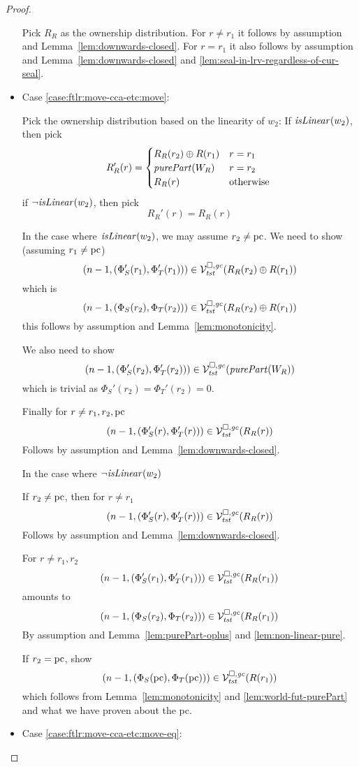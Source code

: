 \begin{proof}
\begin{itemize}
    Pick $R_R$ as the ownership distribution.
    For $r \neq r_1$ it follows by assumption and Lemma~\ref{lem:downwards-closed}.
    For $r = r_1$ it also follows by assumption and Lemma~\ref{lem:downwards-closed} and \ref{lem:seal-in-lrv-regardless-of-cur-seal}.

  \item Case \ref{case:ftlr:move-cca-etc:move}:

    Pick the ownership distribution based on the linearity of $w_2$: If $\isLinear{w_2}$, then pick
    \[
      R_R'(r) =
      \begin{cases}
        R_R(r_2) \oplus R(r_1) & r = r_1 \\
        \purePart{W_R}         & r = r_2 \\
        R_R(r)                 & \totherwise
      \end{cases}
    \]
    if $\neg \isLinear{w_2}$, then pick
    \[
      R_R'(r) = R_R(r)
    \]

    In the case where $\isLinear{w_2}$, we may assume $r_2 \neq \pcreg$. We need to show (assuming $r_1 \neq \pcreg$)
    \[
      \npair[n-1]{(\Phi_S'(r_1),\Phi_T'(r_1))} \in \lrvg{\trust}(R_R(r_2) \oplus R(r_1))
    \]
    which is 
    \[
      \npair[n-1]{(\Phi_S(r_2),\Phi_T(r_2))} \in \lrvg{\trust}(R_R(r_2) \oplus R(r_1))
    \]
    this follows by assumption and Lemma~\ref{lem:monotonicity}.

    We also need to show
    \[
      \npair[n-1]{(\Phi_S'(r_2),\Phi_T'(r_2))} \in \lrvg{\trust}(\purePart{W_R})
    \]
    which is trivial as $\Phi_S'(r_2) = \Phi_T'(r_2) = 0$. 

    Finally for $r \neq r_1,r_2,\pcreg$ 
    \[
      \npair[n-1]{(\Phi_S'(r),\Phi_T'(r))} \in \lrvg{\trust}(R_R(r))
    \]
    Follows by assumption and Lemma~\ref{lem:downwards-closed}.

    In the case where $\neg \isLinear{w_2}$

    If $r_2 \neq \pcreg$, then for $r \neq r_1$
    \[
      \npair[n-1]{(\Phi_S'(r),\Phi_T'(r))} \in \lrvg{\trust}(R_R(r))
    \]
    Follows by assumption and Lemma~\ref{lem:downwards-closed}.
    
    For $r \neq r_1,r_2$
    \[
      \npair[n-1]{(\Phi_S'(r_1),\Phi_T'(r_1))} \in \lrvg{\trust}(R_R(r_1))
    \]
    amounts to
    \[
      \npair[n-1]{(\Phi_S(r_2),\Phi_T(r_2))} \in \lrvg{\trust}(R_R(r_1))
    \]
    By assumption and Lemma~\ref{lem:purePart-oplus} and \ref{lem:non-linear-pure}.

    If $r_2 = \pcreg$, show
    \[
      \npair[n-1]{(\Phi_S(\pcreg),\Phi_T(\pcreg))} \in \lrvg{\trust}(R(r_1))
    \]
    which follows from Lemma~\ref{lem:monotonicity} and \ref{lem:world-fut-purePart} and what we have proven about the pc.
  \item Case \ref{case:ftlr:move-cca-etc:move-eq}:
    

\end{itemize}
\end{proof}
